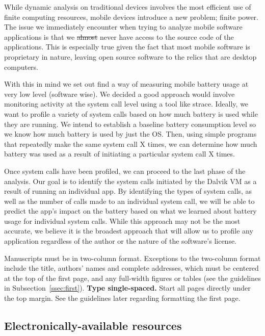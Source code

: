 \documentclass[11pt]{article}
\begin{document}
While dynamic analysis on traditional devices involves the most efficient use of finite 
computing resources, mobile devices introduce a new problem; finite power. The issue we 
immediately encounter when trying to analyze mobile software applications is that we 
\sout{almost} never have access to the source code of the applications. This is 
especially true given the fact that most mobile software is proprietary in nature, 
leaving open source software to the relics that are desktop computers.

With this in mind we set out find a way of measuring mobile battery usage at very low level
(software wise). We decided a good approach would involve monitoring activity at the system 
call level using a tool like strace. Ideally, we want to profile a variety of system calls 
based on how much battery is used while they are running. We intend to establish a baseline 
battery consumption level so we know how much battery is used by just the OS. Then, using 
simple programs that repeatedly make the same system call X times, we can determine how much 
battery was used as a result of initiating a particular system call X times.

Once system calls have been profiled, we can proceed to the last phase of the analysis. Our 
goal is to identify the system calls initiated by the Dalvik VM as a result of running an 
individual app. By identifying the types of system calls, as well as the number of calls made 
to an individual system call, we will be able to predict the app's impact on the battery based 
on what we learned about battery usage for individual system calls. While this approach may not 
be the most accurate, we believe it is the broadest approach that will allow us to profile any 
application regardless of the author or the nature of the software's license.


Manuscripts must be in two-column format.  Exceptions to the
two-column format include the title, authors' names and complete
addresses, which must be centered at the top of the first page, and
any full-width figures or tables (see the guidelines in
Subsection~\ref{ssec:first}). {\bf Type single-spaced.}  Start all
pages directly under the top margin. See the guidelines later
regarding formatting the first page.

\subsection{Electronically-available resources}
\end{document}

